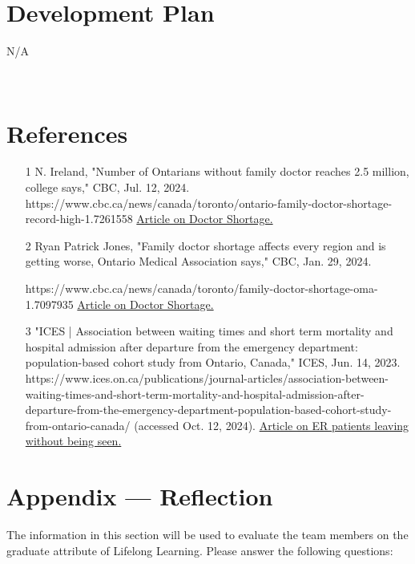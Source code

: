 \documentclass[12pt]{article}
\begin{document}
\section{Development Plan}
N/A


~\newpage

\section{References}
\begin{itemize}
  \item
  [1]N. Ireland, "Number of Ontarians without family doctor reaches 2.5 million, college says," CBC, Jul. 12, 2024. https://www.cbc.ca/news/canada/toronto/ontario-family-doctor-shortage-record-high-1.7261558
  \href{https://www.cbc.ca/news/canada/toronto/ontario-family-doctor-shortage-record-high-1.7261558}{Article on Doctor Shortage.}
  \item 
  [2]Ryan Patrick Jones, "Family doctor shortage affects every region and is getting worse, Ontario Medical Association says," CBC, Jan. 29, 2024.
  
  https://www.cbc.ca/news/canada/toronto/family-doctor-shortage-oma-1.7097935
  \href{https://www.cbc.ca/news/canada/toronto/family-doctor-shortage-oma-1.7097935}{Article on Doctor Shortage.}
  \item
  [3]"ICES | Association between waiting times and short term mortality and hospital admission after departure from the emergency department: population-based cohort study from Ontario, Canada," ICES, Jun. 14, 2023. https://www.ices.on.ca/publications/journal-articles/association-between-waiting-times-and-short-term-mortality-and-hospital-admission-after-departure-from-the-emergency-department-population-based-cohort-study-from-ontario-canada/ (accessed Oct. 12, 2024).
  \href{https://www.ices.on.ca/publications/journal-articles/association-between-waiting-times-and-short-term-mortality-and-hospital-admission-after-departure-from-the-emergency-department-population-based-cohort-study-from-ontario-canada/}{Article on ER patients leaving without being seen.}
\end{itemize}

\newpage{}
\section*{Appendix --- Reflection}

The information in this section will be used to evaluate the team members on the
graduate attribute of Lifelong Learning.  Please answer the following questions:
\end{document}
